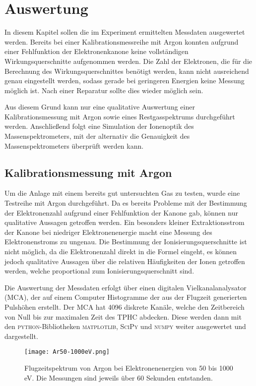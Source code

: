 \chapter{Auswertung}
\label{chap:Auswertung}
In diesem Kapitel sollen die im Experiment ermittelten Messdaten ausgewertet werden. Bereits bei einer Kalibrationsmessreihe mit Argon konnten aufgrund einer Fehlfunktion der Elektronenkanone keine vollständigen Wirkungsquerschnitte aufgenommen werden. Die Zahl der Elektronen, die für die Berechnung des Wirkungsquerschnittes benötigt werden, kann nicht ausreichend genau eingestellt werden, sodass gerade bei geringeren Energien keine Messung möglich ist. Nach einer Reparatur sollte dies wieder möglich sein. 

Aus diesem Grund kann nur eine qualitative Auswertung einer Kalibrationsmessung mit Argon sowie eines Restgasspektrums durchgeführt werden. Anschließend folgt eine Simulation der Ionenoptik des Massenspektrometers, mit der alternativ die Genauigkeit des Massenspektrometers überprüft werden kann.

\section{Kalibrationsmessung mit Argon}
Um die Anlage mit einem bereits gut untersuchten Gas zu testen, wurde eine Testreihe mit Argon durchgeführt. Da es bereits Probleme mit der Bestimmung der Elektronenzahl aufgrund einer Fehlfunktion der Kanone gab, können nur qualitative Aussagen getroffen werden. Ein besonders kleiner Extraktionsstrom der Kanone bei niedriger Elektronenenergie macht eine Messung des Elektronenstroms zu ungenau. Die Bestimmung der Ionisierungsquerschnitte ist nicht möglich, da die Elektronenzahl direkt in die Formel eingeht, es können jedoch qualitative Aussagen über die relativen Häufigkeiten der Ionen getroffen werden, welche proportional zum Ionisierungsquerschnitt sind.

Die Auswertung der Messdaten erfolgt über einen digitalen Vielkanalanalysator (MCA), der auf einem Computer Histogramme der aus der Flugzeit generierten Pulshöhen erstellt. Der MCA hat 4096 diskrete Kanäle, welche den Zeitbereich von Null bis zur maximalen Zeit des TPHC abdecken. Diese werden dann mit den \textsc{python}-Bibliotheken \textsc{matplotlib}, \textsc{SciPy} und \textsc{numpy} weiter ausgewertet und dargestellt. 

\begin{figure}
    \hspace{-1.1cm}\texttt{[image: Ar50-1000eV.png]}
    \caption[Flugzeitspektrum von Argon bei Elektronenenergien von 50 bis 1000 eV]{Flugzeitspektrum von Argon bei Elektronenenergien von 50 bis 1000 eV. Die Messungen sind jeweils über 60 Sekunden entstanden.}
    \label{fig:ar}
\end{figure}

